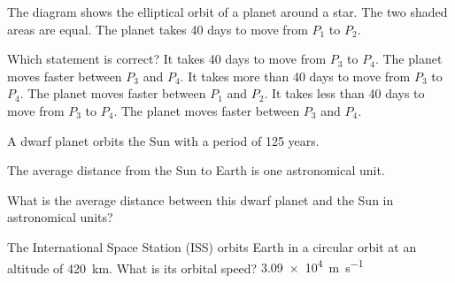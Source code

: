 \documentclass[12pt]{article}
\begin{document}
\begin{quizq}{}
The diagram shows the elliptical orbit of a planet around a star. The two shaded areas are equal.
The planet takes 40 days to move from $P_1$ to $P_2$.
\begin{center}
\end{center}
Which statement is correct?
  {It takes 40 days to move from $P_3$ to $P_4$. The planet moves faster between $P_3$ and $P_4$.}
  {It takes more than 40 days to move from $P_3$ to $P_4$. The planet moves faster between $P_1$
   and $P_2$.}
  {It takes less than 40 days to move from $P_3$ to $P_4$. The planet moves faster between $P_3$
   and $P_4$.}
\end{quizq}

\begin{quizq}{}
A dwarf planet orbits the Sun with a period of 125 years.

The average distance from the Sun to Earth is one astronomical unit.

What is the average distance between this dwarf planet and the Sun in astronomical units?
\end{quizq}

\begin{quizq}{}
The International Space Station (ISS) orbits Earth in a circular orbit at an altitude of
\qty{420}{km}. What is its orbital speed?
  {\qty{3.09e4}{m.s^{-1}}}
\end{quizq}
\end{document}
